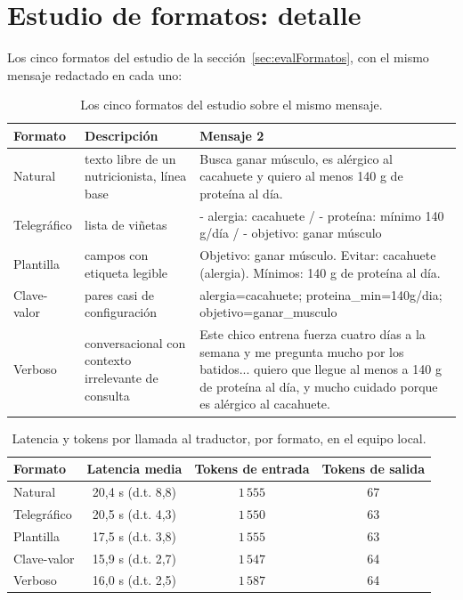 \section{Estudio de formatos: detalle}
\label{sec:anexoFormatos}

Los cinco formatos del estudio de la sección~\ref{sec:evalFormatos}, con el mismo mensaje redactado en cada uno:

\begin{table}[htbp]
\centering
\small
\begin{tabular}{|l|p{4cm}|p{7cm}|}
\hline
\textbf{Formato} & \textbf{Descripción} & \textbf{Mensaje 2} \\
\hline
Natural & texto libre de un nutricionista, línea base & Busca ganar músculo, es alérgico al cacahuete y quiero al menos 140 g de proteína al día. \\
\hline
Telegráfico & lista de viñetas & - alergia: cacahuete / - proteína: mínimo 140 g/día / - objetivo: ganar músculo \\
\hline
Plantilla & campos con etiqueta legible & Objetivo: ganar músculo. Evitar: cacahuete (alergia). Mínimos: 140 g de proteína al día. \\
\hline
Clave-valor & pares casi de configuración & \raggedright\arraybackslash alergia=cacahuete; proteina\_min=140g/dia; objetivo=ganar\_musculo \\
\hline
Verboso & conversacional con contexto irrelevante de consulta & Este chico entrena fuerza cuatro días a la semana y me pregunta mucho por los batidos... quiero que llegue al menos a 140 g de proteína al día, y mucho cuidado porque es alérgico al cacahuete. \\
\hline
\end{tabular}
\caption{Los cinco formatos del estudio sobre el mismo mensaje.}
\label{tab:anexoFormatos}
\end{table}

\begin{table}[htbp]
\centering
\small
\begin{tabular}{|l|c|c|c|}
\hline
\textbf{Formato} & \textbf{Latencia media} & \textbf{Tokens de entrada} & \textbf{Tokens de salida} \\
\hline
Natural & 20,4 s (d.t. 8,8) & $1\,555$ & 67 \\
\hline
Telegráfico & 20,5 s (d.t. 4,3) & $1\,550$ & 63 \\
\hline
Plantilla & 17,5 s (d.t. 3,8) & $1\,555$ & 63 \\
\hline
Clave-valor & 15,9 s (d.t. 2,7) & $1\,547$ & 64 \\
\hline
Verboso & 16,0 s (d.t. 2,5) & $1\,587$ & 64 \\
\hline
\end{tabular}
\caption{Latencia y tokens por llamada al traductor, por formato, en el equipo local.}
\label{tab:anexoLatencia}
\end{table}

